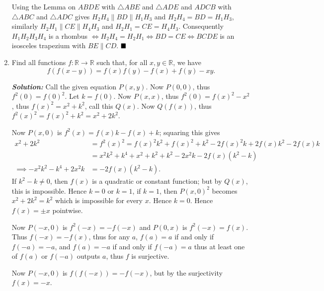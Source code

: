 \documentclass[11pt]{article}
\newcommand{\sol}{\textbf{\textit{Solution: }}}
\begin{document}
\begin{enumerate}[topsep=\bigskipamount,itemsep=\bigskipamount,leftmargin=0pt]
\begin{center}
\end{center}
Using the Lemma on $ABDE$ with $\triangle ABE$ and $\triangle ADE$ and $ADCB$ with $\triangle ABC$ and $\triangle ADC$ gives $H_2H_4 \parallel BD \parallel H_1H_3$ and $H_2H_4= BD= H_1H_3$, similarly $H_2H_1 \parallel CE \parallel H_4H_3$ and $H_2H_1= CE= H_4H_3$.
Consequently $H_1H_2H_3H_4$ is a rhombus $\iff H_2H_4 = H_2H_1 \iff BD = CE \iff BCDE$ is an isosceles trapezium with $BE \parallel CD$. $\hfill\blacksquare$

\item Find all functions \(f: \mathbb{R} \to \mathbb{R}\) such that, for all \(x, y \in \mathbb{R}\), we have
\[f(f(x - y)) = f(x)f(y) - f(x) + f(y) - xy.\]

\sol
Call the given equation $P(x,y)$.
Now $P(0,0)$, thus $f^2(0) = f(0)^2$.
Let $k = f(0)$.
Now $P(x,x)$, thus $f^2(0) = f(x)^2-x^2$, thus $f(x)^2 = x^2+k^2$, call this $Q(x)$.
Now $Q(f(x))$, thus $f^2(x)^2 = f(x)^2 + k^2 = x^2 + 2k^2$.

Now $P(x,0)$ is $f^2(x) = f(x) k - f(x) + k$; squaring this gives
\begin{align*}
    x^2 + 2k^2 &= f^2(x)^2 = f(x)^2 k^2 + f(x)^2 + k^2 - 2f(x)^2 k + 2 f(x) k^2 - 2f(x) k \\
    &= x^2 k^2 + k^4 + x^2 + k^2 + k^2 - 2 x^2 k - 2 f(x) (k^2 - k) \\
    \implies -x^2 k^2 - k^4 + 2x^2 k &= -2f(x) (k^2 - k).
\end{align*}
If $k^2-k\neq 0$, then $f(x)$ is a quadratic or constant function; but by $Q(x)$, this is impossible.
Hence $k=0$ or $k=1$, if $k=1$, then $P(x,0)^2$ becomes $x^2 + 2k^2 = k^2$ which is impossible for every $x$.
Hence $k=0$.
Hence $f(x) = \pm x$ pointwise.

Now $P(-x,0)$ is $f^2(-x) = -f(-x)$ and $P(0,x)$ is $f^2(-x) = f(x)$.
Thus $f(-x) = -f(x)$, thus for any $a$, $f(a) = a$ if and only if $f(-a) = -a$, and $f(a) = -a$ if and only if $f(-a) = a$ thus at least one of $f(a)$ or $f(-a)$ outputs $a$, thus $f$ is surjective.

Now $P(-x,0)$ is $f(f(-x)) = -f(-x)$, but by the surjectivity $f(x) = -x$. 


\end{enumerate}
\end{document}
